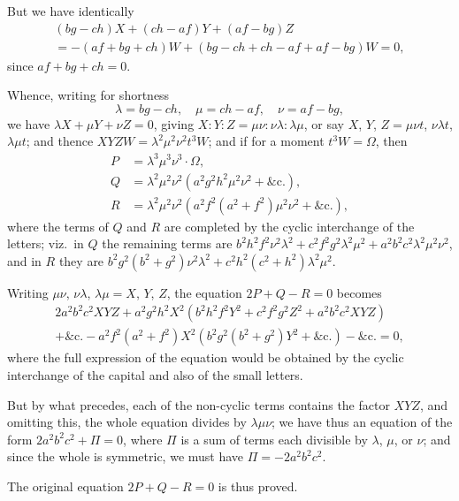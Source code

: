 \documentclass[11pt,a4paper]{book}
\begin{document}
But we have identically
\begin{multline*}
(bg - ch)X + (ch - af)Y + (af - bg)Z \\
= -(af + bg + ch)W + (bg - ch + ch - af + af - bg)W = 0,
\end{multline*}
since $af + bg + ch = 0$.

Whence, writing for shortness
\[
\lambda = bg - ch, \quad \mu = ch - af, \quad \nu = af - bg,
\]
we have $\lambda X + \mu Y + \nu Z = 0$, giving $X : Y : Z = \mu\nu : \nu\lambda : \lambda\mu$, or say $X$, $Y$, $Z = \mu\nu t$, $\nu\lambda t$, $\lambda\mu t$; and thence $XYZW = \lambda^2\mu^2\nu^2 t^3 W$; and if for a moment $t^3 W = \Omega$, then
\begin{align*}
P &= \lambda^3\mu^3\nu^3 \cdot \Omega, \\
Q &= \lambda^2\mu^2\nu^2(a^2g^2h^2\mu^2\nu^2 + \&\text{c.}), \\
R &= \lambda^2\mu^2\nu^2(a^2f^2(a^2+f^2)\mu^2\nu^2 + \&\text{c.}),
\end{align*}
where the terms of $Q$ and $R$ are completed by the cyclic interchange of the letters; viz.\ in $Q$ the remaining terms are $b^2h^2f^2\nu^2\lambda^2 + c^2f^2g^2\lambda^2\mu^2 + a^2b^2c^2\lambda^2\mu^2\nu^2$, and in $R$ they are $b^2g^2(b^2+g^2)\nu^2\lambda^2 + c^2h^2(c^2+h^2)\lambda^2\mu^2$.

\newpage

Writing $\mu\nu$, $\nu\lambda$, $\lambda\mu = X$, $Y$, $Z$, the equation $2P + Q - R = 0$ becomes
\begin{multline*}
2a^2b^2c^2 XYZ + a^2g^2h^2 X^2(b^2h^2f^2 Y^2 + c^2f^2g^2 Z^2 + a^2b^2c^2 XYZ) \\
+ \&\text{c.}
- a^2f^2(a^2+f^2)X^2(b^2g^2(b^2+g^2)Y^2 + \&\text{c.}) - \&\text{c.} = 0,
\end{multline*}
where the full expression of the equation would be obtained by the cyclic interchange of the capital and also of the small letters.

But by what precedes, each of the non-cyclic terms contains the factor $XYZ$, and omitting this, the whole equation divides by $\lambda\mu\nu$; we have thus an equation of the form $2a^2b^2c^2 + \Pi = 0$, where $\Pi$ is a sum of terms each divisible by $\lambda$, $\mu$, or $\nu$; and since the whole is symmetric, we must have $\Pi = -2a^2b^2c^2$.

The original equation $2P + Q - R = 0$ is thus proved.

\newpage
\end{document}

